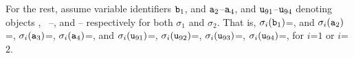 \noindent 
For the rest,  assume variable identifiers ${\mbox{\tt{b}}}_1$, and ${\mbox{\tt{a}}}_2$--${\mbox{\tt{a}}}_4$, and  ${\mbox{\tt{u}}}_{91}$--${\mbox{\tt{u}}}_{94}$ denoting objects , \ --,
and   -- respectively for both $\sigma_1$ and $\sigma_2$.
That  is, $\sigma_i({\mbox{\tt{b}}}_1)$=, and 
$\sigma_i({\mbox{\tt{a}}}_2)$=, $\sigma_i({\mbox{\tt{a}}}_3)$=,  $\sigma_i({\mbox{\tt{a}}}_4)$=, and  
  $\sigma_i({\mbox{\tt{u}}}_{91})$=, $\sigma_i({\mbox{\tt{u}}}_{92})$=,   
  $\sigma_i({\mbox{\tt{u}}}_{93})$=, $\sigma_i({\mbox{\tt{u}}}_{94})$=,
  for $i$=$1$ or $i$=$2$.



  


